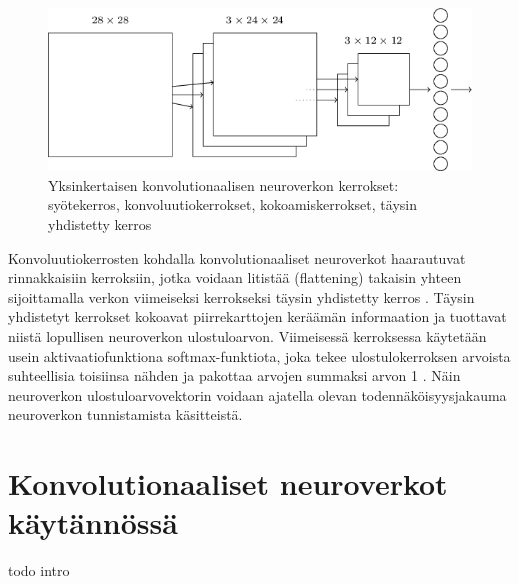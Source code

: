 \documentclass[finnish]{tktltiki2}
\theoremstyle{definition}
\theoremstyle{remark}
\begin{document}
    \begin{figure}[h]
      \centering
      \includegraphics[scale=0.5]{convnet-architecture}
      \caption{Yksinkertaisen konvolutionaalisen neuroverkon kerrokset: syötekerros, konvoluutiokerrokset, kokoamiskerrokset, täysin yhdistetty kerros \cite{Nielsen-neural}}
      \label{pic:convnet-architecture}
    \end{figure}
    Konvoluutiokerrosten kohdalla konvolutionaaliset neuroverkot haarautuvat rinnakkaisiin kerroksiin, jotka voidaan litistää (flattening) takaisin yhteen sijoittamalla verkon viimeiseksi kerrokseksi täysin yhdistetty kerros \cite{Nielsen-neural}. Täysin yhdistetyt kerrokset kokoavat piirrekarttojen keräämän informaation ja tuottavat niistä lopullisen neuroverkon ulostuloarvon. Viimeisessä kerroksessa käytetään usein aktivaatiofunktiona softmax-funktiota, joka tekee ulostulokerroksen arvoista suhteellisia toisiinsa nähden ja pakottaa arvojen summaksi arvon 1 \cite{Nielsen-neural}. Näin neuroverkon ulostuloarvovektorin voidaan ajatella olevan todennäköisyysjakauma neuroverkon tunnistamista käsitteistä. 

  \section{Konvolutionaaliset neuroverkot käytännössä}
  todo intro



    
\end{document}
